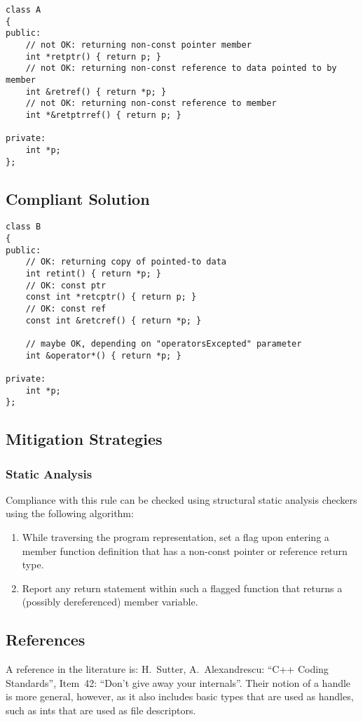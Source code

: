 \begin{verbatim}
class A
{
public:
    // not OK: returning non-const pointer member
    int *retptr() { return p; }
    // not OK: returning non-const reference to data pointed to by member
    int &retref() { return *p; }
    // not OK: returning non-const reference to member
    int *&retptrref() { return p; }

private:
    int *p;
};
\end{verbatim}

\subsection{Compliant Solution}

\begin{verbatim}
class B
{
public:
    // OK: returning copy of pointed-to data
    int retint() { return *p; }
    // OK: const ptr
    const int *retcptr() { return p; }
    // OK: const ref
    const int &retcref() { return *p; }

    // maybe OK, depending on "operatorsExcepted" parameter
    int &operator*() { return *p; }

private:
    int *p;
};
\end{verbatim}

\subsection{Mitigation Strategies}
\subsubsection{Static Analysis} 

Compliance with this rule can be checked using structural static analysis checkers using the following algorithm:

\begin{enumerate}
\item While traversing the program representation, set a flag upon entering a
member function definition that has a non-const pointer or reference return
type.
\item Report any return statement within such a flagged function that returns
a (possibly dereferenced) member variable.
\end{enumerate}

\subsection{References}

A reference in the literature is: H.~Sutter, A.~Alexandrescu: ``C++ Coding
Standards'', Item~42: ``Don't give away your internals''. Their notion of a
handle is more general, however, as it also includes basic types that are used
as handles, such as ints that are used as file descriptors.
